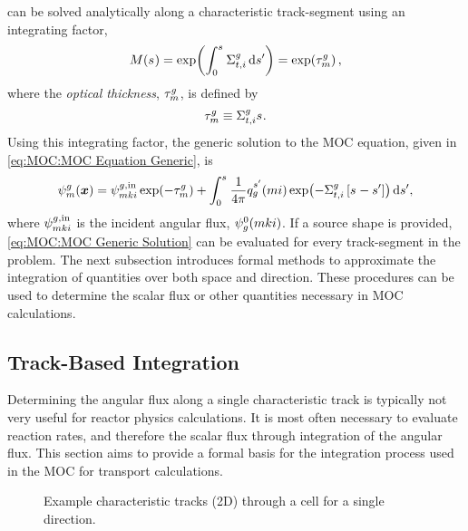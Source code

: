 {{         can be solved analytically along a characteristic track-segment using an integrating factor,
        \begin{equation}\label{eq:MOC:Integrating Factor}
            M(\len) = \exp\!\left(\intl[0][\len]\xst\dif{s'}\right) = \exp\!\left(\opt\right),
        \end{equation}
        where the \emph{optical thickness}, $\opt$, is defined by
        \begin{equation}\label{eq:MOC:Optical Thickness Definition}
            \opt \defined \xst\len.
        \end{equation}
        Using this integrating factor, the generic solution to the \ac{MOC} equation, given in \cref{eq:MOC:MOC Equation Generic}, is
        \begin{equation}\label{eq:MOC:MOC Generic Solution}
            \aflux = \afluxin\exp\!\left(-\opt\right) + \intl[0][\len]\rfourpi\source[mi][g][\len']\exp\!\left(-\xst\left[\len-\len'\right]\right)\dif{s'},
        \end{equation}
        where $\afluxin$ is the incident angular flux, $\aflux[mki][g][0]$.
        If a source shape is provided, \cref{eq:MOC:MOC Generic Solution} can be evaluated for every track-segment in the problem.
        The next subsection introduces formal methods to approximate the integration of quantities over both space and direction.
        These procedures can be used to determine the scalar flux or other quantities necessary in \ac{MOC} calculations.

        \subsection{Track-Based Integration}{\label{ssec:MOC:Track-Based Integration}
            Determining the angular flux along a single characteristic track is typically not very useful for reactor physics calculations.
            It is most often necessary to evaluate reaction rates, and therefore the scalar flux through integration of the angular flux.
            This section aims to provide a formal basis for the integration process used in the \ac{MOC} for transport calculations.

            \begin{figure}[h]
                \centering
                \def\svgwidth{0.4\linewidth}
                
                \caption{Example characteristic tracks (2D) through a cell for a single direction.}
                \label{fig:MOC:MOC Tracks}
            \end{figure}

}}}
